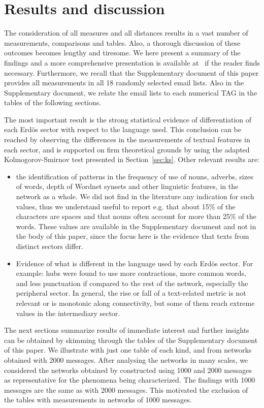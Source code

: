 \documentclass[review]{elsarticle}
\begin{document}
\section{Results and discussion}\label{sres}\label{sec:tresults}
The consideration of all measures and all distances results in a vast number of measurements, comparisons and tables.
Also, a thorough discussion of these outcomes becomes lengthy and tiresome.
We here present a summary of the findings and
a more comprehensive presentation is available at~\cite{thesis} if
the reader finds necessary.
Furthermore, we recall that the Supplementary document of this paper provides all measurements in all 18 randomly selected email lists.
Also in the Supplementary document, we relate the email lists to each numerical
TAG in the tables of the following sections.

The most important result is the strong statistical evidence of differentiation of each Erd\"os sector with respect to the language used.
This conclusion can be reached by observing the differences in the measurements of textual features in
each sector, and is supported on firm theoretical grounds by using the adapted Kolmogorov-Smirnov test presented in Section~\ref{sec:ks}.
Other relevant results are:
\begin{itemize}
\item the identification of patterns in the frequency of use of nouns, adverbs, sizes of words, depth of Wordnet synsets and other linguistic features, in the network as a whole.
  We did not find in the literature any indication for such values, thus we understand useful to report e.g. that about 15\% of the characters are spaces and that nouns often account for more than 25\% of the words.
These values are available in the Supplementary document and not in the body of this paper,
since the focus here is the evidence that texts from distinct sectors differ.
\item Evidence of what is different in the language used by each Erd\"os sector. For example: hubs were found to use more contractions,
more common words, and less punctuation if compared to the rest of the network,
especially the peripheral sector.
In general, the rise or fall of a text-related metric is not relevant or is monotonic along connectivity,
but some of them reach extreme values in the intermediary sector.
\end{itemize}

The next sections summarize results of immediate interest
and further insights can be obtained by skimming through
the tables of the Supplementary document of this paper.
We illustrate with just one table of each kind,
and from networks obtained with 2000 messages.
After analysing the networks in many scales,
we considered the networks obtained by constructed using 1000 and 2000 messages as representative for the phenomena being characterized.
The findings with 1000 messages are the same as with 2000 messages.
This motivated the exclusion of the tables with measurements in
networks of 1000 messages.
\end{document}
